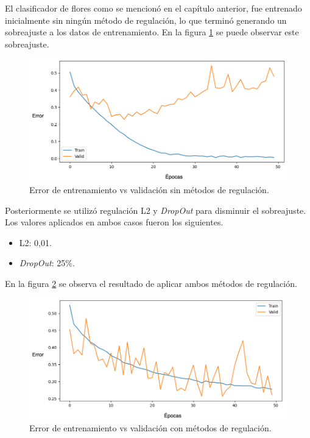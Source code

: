 El clasificador de flores como se mencionó en el capítulo anterior, fue entrenado inicialmente sin ningún método de regulación, lo que terminó generando un sobreajuste a los datos de entrenamiento. En la figura \ref{fig:e1} se puede observar este sobreajuste.

\begin{figure}[ht]
	\centering
	\includegraphics[scale=0.4]{./Figures/z.drawio.png}
	\caption{Error de entrenamiento vs validación sin métodos de regulación.}
	\label{fig:e1}
\end{figure}

Posteriormente se utilizó regulación L2 y \textit{DropOut} para disminuir el sobreajuste. Los valores aplicados en ambos casos fueron los siguientes.

\begin{itemize}
	\item L2: 0,01.
    \item \textit{DropOut}: 25\%.
\end{itemize}

En la figura \ref{fig:e2} se observa el resultado de aplicar ambos métodos de regulación.

\begin{figure}[ht]
	\centering
	\includegraphics[scale=0.4]{./Figures/x.drawio.png}
	\caption{Error de entrenamiento vs validación con métodos de regulación.}
	\label{fig:e2}
\end{figure}


